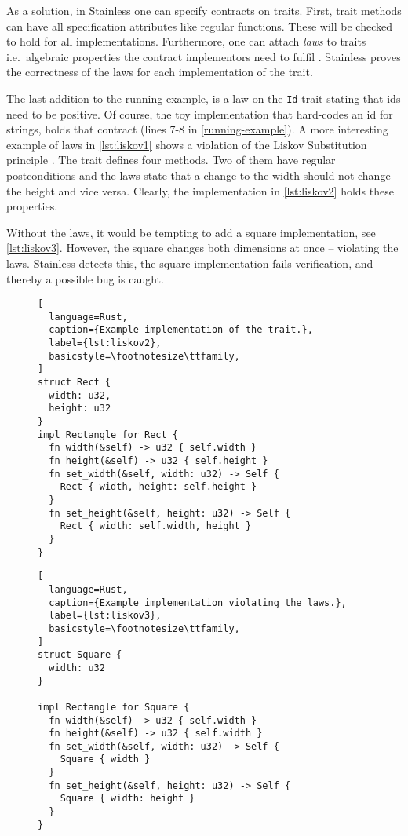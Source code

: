 As a solution, in Stainless one can specify contracts on traits. First, trait
methods can have all specification attributes like regular functions. These will
be checked to hold for all implementations. Furthermore, one can attach
\emph{laws} to traits i.e.~algebraic properties the contract implementors need
to fulfil \cite[section "Specifying Algebraic Properties"]{stainless-doc}.
Stainless proves the correctness of the laws for each implementation of the
trait.

The last addition to the running example, is a law on the \lstinline!Id! trait
stating  that ids need to be positive. Of course, the toy implementation that
hard-codes an id for strings, holds that contract (lines 7-8 in
\autoref{running-example}). A more interesting example of laws in
\autoref{lst:liskov1} shows a violation of the  Liskov Substitution principle
\cite{liskov}. The trait defines four methods. Two of them have regular
postconditions and the laws state that a change to the width should not change
the height and vice versa. Clearly, the implementation in \autoref{lst:liskov2}
holds these properties.

Without the laws, it would be tempting to add a square implementation, see
\autoref{lst:liskov3}. However, the square changes both dimensions at once --
violating the laws. Stainless detects this, the square implementation fails
verification, and thereby a possible bug is caught.

\begin{figure}[hbt]
\noindent \begin{minipage}[t]{.49\textwidth}
\begin{lstlisting}[
  language=Rust,
  caption={Example implementation of the trait.},
  label={lst:liskov2},
  basicstyle=\footnotesize\ttfamily,
]
struct Rect {
  width: u32,
  height: u32
}
impl Rectangle for Rect {
  fn width(&self) -> u32 { self.width }
  fn height(&self) -> u32 { self.height }
  fn set_width(&self, width: u32) -> Self {
    Rect { width, height: self.height }
  }
  fn set_height(&self, height: u32) -> Self {
    Rect { width: self.width, height }
  }
}
\end{lstlisting}
\end{minipage}\hfill
\begin{minipage}[t]{.49\textwidth}
\begin{lstlisting}[
  language=Rust,
  caption={Example implementation violating the laws.},
  label={lst:liskov3},
  basicstyle=\footnotesize\ttfamily,
]
struct Square {
  width: u32
}

impl Rectangle for Square {
  fn width(&self) -> u32 { self.width }
  fn height(&self) -> u32 { self.width }
  fn set_width(&self, width: u32) -> Self {
    Square { width }
  }
  fn set_height(&self, height: u32) -> Self {
    Square { width: height }
  }
}
\end{lstlisting}
\end{minipage}
\end{figure}

